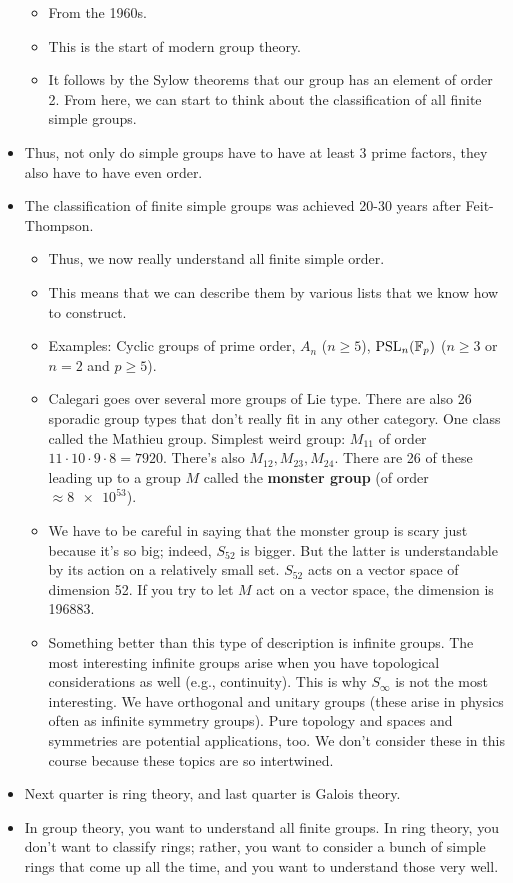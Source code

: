 \documentclass[../notes.tex]{subfiles}
\begin{document}
\begin{itemize}
\begin{itemize}
        \item From the 1960s.
        \item This is the start of modern group theory.
        \item It follows by the Sylow theorems that our group has an element of order 2. From here, we can start to think about the classification of all finite simple groups.
    \end{itemize}
    \item Thus, not only do simple groups have to have at least 3 prime factors, they also have to have even order.
    \item The classification of finite simple groups was achieved 20-30 years after Feit-Thompson.
    \begin{itemize}
        \item Thus, we now really understand all finite simple order.
        \item This means that we can describe them by various lists that we know how to construct.
        \item Examples: Cyclic groups of prime order, $A_n$ ($n\geq 5$), $\text{PSL}_n(\mathbb{F}_p)$ ($n\geq 3$ or $n=2$ and $p\geq 5$).
        \item Calegari goes over several more groups of Lie type. There are also 26 sporadic group types that don't really fit in any other category. One class called the Mathieu group. Simplest weird group: $M_{11}$ of order $11\cdot 10\cdot 9\cdot 8=7920$. There's also $M_{12},M_{23},M_{24}$. There are 26 of these leading up to a group $M$ called the \textbf{monster group} (of order $\approx\num{8e53}$).
        \item We have to be careful in saying that the monster group is scary just because it's so big; indeed, $S_{52}$ is bigger. But the latter is understandable by its action on a relatively small set. $S_{52}$ acts on a vector space of dimension 52. If you try to let $M$ act on a vector space, the dimension is 196883.
        \item Something better than this type of description is infinite groups. The most interesting infinite groups arise when you have topological considerations as well (e.g., continuity). This is why $S_\infty$ is not the most interesting. We have orthogonal and unitary groups (these arise in physics often as infinite symmetry groups). Pure topology and spaces and symmetries are potential applications, too. We don't consider these in this course because these topics are so intertwined.
    \end{itemize}
    \item Next quarter is ring theory, and last quarter is Galois theory.
    \item In group theory, you want to understand all finite groups. In ring theory, you don't want to classify rings; rather, you want to consider a bunch of simple rings that come up all the time, and you want to understand those very well.
\end{itemize}
\end{document}
